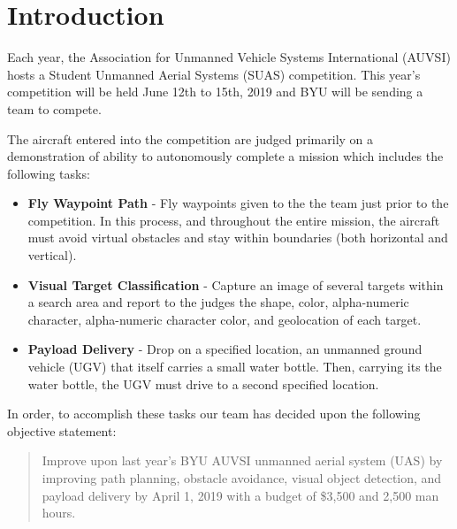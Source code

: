 \documentclass[]{auvsi_doc}
\begin{document}
\begin{AUVSITitlePage}
\begin{artifacttable}
\end{artifacttable}
\end{AUVSITitlePage}


\section{ Introduction}

Each year, the Association for Unmanned Vehicle Systems International (AUVSI) hosts a Student Unmanned Aerial Systems (SUAS) competition. This year’s competition will be held June 12th to 15th, 2019 and BYU will be sending a team to compete.

The aircraft entered into the competition are judged primarily on a demonstration of ability to autonomously complete a mission which includes the following tasks:

\begin{itemize}
	\item\textbf{Fly Waypoint Path} - Fly waypoints given to the the team just prior to the competition. In this process, and throughout the entire mission, the aircraft must avoid virtual obstacles and stay within boundaries (both horizontal and vertical).
	\item\textbf{Visual Target Classification} - Capture an image of several targets within a search area and report to the judges the shape, color, alpha-numeric character, alpha-numeric character color, and geolocation of each target.
	\item\textbf{Payload Delivery} - Drop on a specified location, an unmanned ground vehicle (UGV) that itself carries a small water bottle. Then, carrying its the water bottle, the UGV must drive to a second specified location.
\end{itemize}

In order, to accomplish these tasks our team has decided upon the following objective statement:

\begin{quote}
Improve upon last year’s BYU AUVSI unmanned aerial system (UAS) by improving path planning, obstacle avoidance, visual object detection, and payload delivery by April 1, 2019 with a budget of \$3,500 and 2,500 man hours.
\end{quote}
\end{document}
